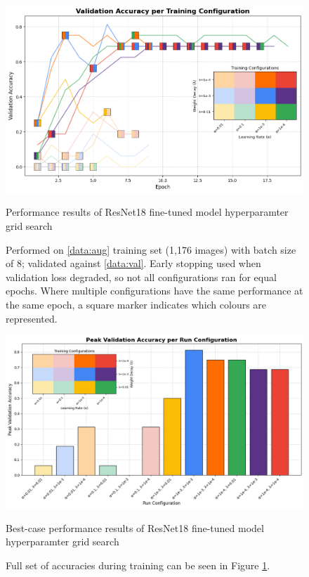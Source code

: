                         \begin{figure}[h]
                            \centering
                            \includegraphics[width=\textwidth]{images/ResNetCNN_AugGrid.png}
                            \caption{Performance results of ResNet18 fine-tuned model hyperparamter grid search}
                            \caption*{Performed on \ref{data:aug} training set (1,176 images) with batch size of 8; validated against \ref{data:val}. Early stopping used when validation loss degraded, so not all configurations ran for equal epochs. Where multiple configurations have the same performance at the same epoch, a square marker indicates which colours are represented.}
                            \label{fig:ResNet_AugGrid}
                        \end{figure}
                
                        \begin{figure}[h]
                            \centering
                            \includegraphics[width=\textwidth]{images/ResNetCNN_AugGridHist.png}
                            \caption{Best-case performance results of ResNet18 fine-tuned model hyperparamter grid search}
                            \caption*{
                                Full set of accuracies during training can be seen in Figure \ref{fig:ResNet_AugGrid}.
                            }
                            \label{fig:ResNet_AugGridHist}
                        \end{figure}
        
